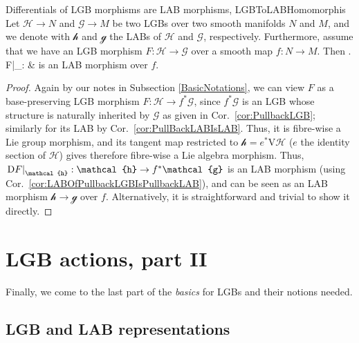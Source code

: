 \documentclass[a4paper,oneside,11pt,bibliography=totoc]{scrartcl}
\def\bas#1\eas{\begin{align*}#1\end{align*}}
\theoremstyle{plain}
\theoremstyle{remark}
\theoremstyle{definition}
\begin{document}
\begin{corollaries}{Differentials of LGB morphisms are LAB morphisms, \newline \cite[\S 3.5, section about morphisms, page 124f.]{mackenzieGeneralTheory}}{LGBToLABHomomorphis}
Let $\mathcal{H} \to N$ and $\mathcal{G} \to M$ be two LGBs over two smooth manifolds $N$ and $M$, and we denote with $\mathcal{h}$ and $\mathcal{g}$ the LABs of $\mathcal{H}$ and $\mathcal{G}$, respectively. Furthermore, assume that we have an LGB morphism $F: \mathcal{H} \to \mathcal{G}$ over a smooth map $f: N \to M$. Then
\bas
\mleft. F\mright|_{}:  &\to {}
\eas
is an LAB morphism over $f$.
\end{corollaries}

\begin{proof}
\leavevmode\newline
Again by our notes in Subsection \ref{BasicNotations}, we can view $F$ as a base-preserving LGB morphism $F: \mathcal{H} \to f^*\mathcal{G}$, since $f^*\mathcal{G}$ is an LGB whose structure is naturally inherited by $\mathcal{G}$ as given in Cor.\ \ref{cor:PullbackLGB}; similarly for its LAB by Cor.\ \ref{cor:PullBackLABIsLAB}. Thus, it is fibre-wise a Lie group morphism, and its tangent map restricted to $\mathcal{h} = e^*\mathrm{V}\mathcal{H}$ ($e$ the identity section of $\mathcal{H}$) gives therefore fibre-wise a Lie algebra morphism. Thus, $\mleft.\mathrm{D} F\mright|_{\mathcal{h}}: \mathcal{h} \to f^*\mathcal{g}$ is an LAB morphism (using Cor.\ \ref{cor:LABOfPullbackLGBIsPullbackLAB}), and can be seen as an LAB morphism $\mathcal{h} \to \mathcal{g}$ over $f$. Alternatively, it is straightforward and trivial to show it directly.
\end{proof}

\section{LGB actions, part II}\label{LGBActionIISection}

Finally, we come to the last part of the \textit{basics} for LGBs and their notions needed.

\subsection{LGB and LAB representations}
\end{document}
